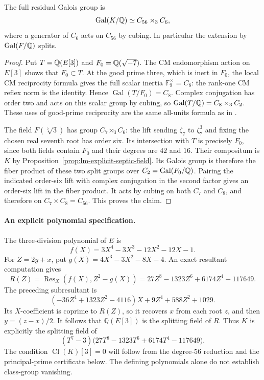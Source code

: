 \begin{corollary}\label{cor:septic-residual-group}
The full residual Galois group is
\[
 \operatorname{Gal}(K/\mathbb Q)\simeq C_{56}\rtimes_3 C_6,
\]
where a generator of $C_6$ acts on $C_{56}$ by cubing.
In particular the extension by $\operatorname{Gal}(F/\mathbb Q)$ splits.
\end{corollary}
\begin{proof}
Put $T=\mathbb Q(E[3])$ and $F_0=\mathbb Q(\sqrt{-7})$.
The CM endomorphism action on $E[3]$ shows that $F_0\subset T$.
At the good prime three, which is inert in $F_0$, the local
CM reciprocity formula gives the full scalar inertia
$\mathbb F_9^\times=C_8$: the rank-one CM reflex norm is the
identity. Hence $\operatorname{Gal}(T/F_0)=C_8$.
Complex conjugation has order two and acts on this scalar
group by cubing, so $\operatorname{Gal}(T/\mathbb Q)=C_8\rtimes_3 C_2$.
These uses of good-prime reciprocity are the same
all-units formula as in \citet[Theorem~5.1, pp.~483--484]{Lombardo2017}.

The field $F(\sqrt[7]{3})$ has group $C_7\rtimes_3 C_6$:
the lift sending $\zeta_7$ to $\zeta_7^3$ and fixing the
chosen real seventh root has order six. Its intersection
with $T$ is precisely $F_0$, since both fields contain $F_0$
and their degrees are $42$ and $16$. Their compositum is
$K$ by Proposition~\ref{prop:lm-explicit-septic-field}.
Its Galois group is therefore the fiber product of these
two split groups over $C_2=\operatorname{Gal}(F_0/\mathbb Q)$.
Pairing the indicated order-six lift with complex conjugation
in the second factor gives an order-six lift in the fiber
product. It acts by cubing on both $C_7$ and $C_8$,
and therefore on $C_7\times C_8=C_{56}$. This proves the claim.
\end{proof}

\paragraph{An explicit polynomial specification.}
The three-division polynomial of $E$ is
\[
 f(X)=3X^4-3X^3-12X^2-12X-1.
\]
For $Z=2y+x$, put $g(X)=4X^3-3X^2-8X-4$.
An exact resultant computation gives
\[
 R(Z)=\operatorname{Res}_X(f(X),Z^2-g(X))
 =27Z^8-1323Z^6+6174Z^4-117649.
\]
The preceding subresultant is
\[
 (-36Z^4+1323Z^2-4116)X
       +9Z^4+588Z^2+1029.
\]
Its $X$-coefficient is coprime to $R(Z)$, so it recovers
$x$ from each root $z$, and then $y=(z-x)/2$.
It follows that $\mathbb Q(E[3])$ is the splitting
field of $R$.  Thus $K$ is explicitly the splitting
field of
\[
 (T^7-3)\bigl(27T^8-1323T^6+6174T^4-117649\bigr).
\]
The condition $\operatorname{Cl}(K)[3]=0$ will follow from the
degree-$56$ reduction and the principal-prime certificate below.
The defining polynomials alone do not establish class-group vanishing.
